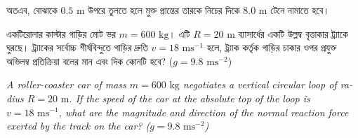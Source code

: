 \documentclass[12pt, a4paper]{article}
\begin{document}
{\begin{tcolorbox}[solutionbox={সমাধান (Solution)}]
অতএব, বোঝাকে $0.5\text{ m}$ উপরে তুলতে হলে মুক্ত প্রান্তের তারকে নিচের দিকে $8.0\text{ m}$ টেনে নামাতে হবে।
\end{tcolorbox}
\vspace{1em}

\begin{tcolorbox}[questionbox={প্রশ্ন (Question) 50}]
\noindent
একটিরোলার কাস্টার গাড়ির মোট ভর $m = 600\text{ kg}$। এটি $R = 20\text{ m}$ ব্যাসার্ধের একটি উল্লম্ব বৃত্তাকার ট্র্যাকে ঘুরছে। ট্র্যাকের সর্বোচ্চ শীর্ষবিন্দুতে গাড়ির দ্রুতি $v = 18\text{ ms}^{-1}$ হলে, ট্র্যাক কর্তৃক গাড়ির চাকার ওপর প্রযুক্ত অভিলম্ব প্রতিক্রিয়া বলের মান এবং দিক কোনটি হবে? ($g = 9.8\text{ ms}^{-2}$)

\vspace{0.8em}
\begin{english}
\noindent\textit{\color{darkgray}
A roller-coaster car of mass $m = 600\text{ kg}$ negotiates a vertical circular loop of radius $R = 20\text{ m}$. If the speed of the car at the absolute top of the loop is $v = 18\text{ ms}^{-1}$, what are the magnitude and direction of the normal reaction force exerted by the track on the car? ($g = 9.8\text{ ms}^{-2}$)
}
\end{english}
\end{tcolorbox}

\vspace{1em}
\begin{center}
\end{center}}
\end{document}
